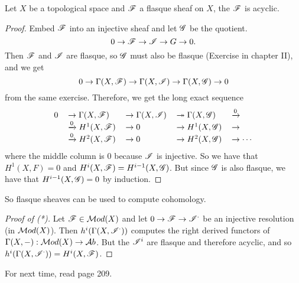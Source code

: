 \begin{proposition}
Let $X$ be a topological space and $\mathscr{F}$ a flasque sheaf on $X$,
the $\mathscr{F}$ is acyclic.
\end{proposition}
\begin{proof}
 Embed $\mathscr{F}$ into an injective sheaf and let $\mathscr{G}$ be the quotient.
 \[
    0\to \mathscr{F}\to \mathscr{I} \to G\to 0.
 \]
Then $\mathscr{F}$ and $\mathscr{I}$ are flasque, so $\mathscr{G}$ must also be flasque
(Exercise in chapter II), and we get
\[
    0\to \Gamma(X,\mathscr{F})\to \Gamma(X,\mathscr{I})\to \Gamma(X,\mathscr{G})\to 0
\]
from the same exercise.  Therefore, we get the long exact sequence
\[\begin{tabular}{lllll}
 0 &$\to \Gamma(X,\F) $&$\to \Gamma(X,\I) $&$\twoheadrightarrow
 \Gamma(X,\G) $&$\xrightarrow{0}$\\
 &$\xrightarrow{0} H^1(X,\F) $&$\to 0 $&$\to H^1(X,\G)$&$ \to$ \\
 &$\xrightarrow{0} H^2(X,\F) $&$\to 0 $&$\to H^2(X,\G)$&$ \to \cdots$ \\
\end{tabular}\]
where the middle column is 0 because $\mathscr{I}$ is injective.  So we
have that $H^1(X,F)=0$ and $H^i(X,\mathscr{F})=H^{i-1}(X,\mathscr{G})$.  But since
$\mathscr{G}$ is also flasque, we have that $H^{i-1}(X,\mathscr{G})=0$ by induction.
\end{proof}

So flasque sheaves can be used to compute cohomology.

\begin{proof}[Proof of (*)]
Let $\mathscr{F}\in \mathcal{M}od(X)$ and let $0\to \mathscr{F}\to \mathscr{I}^{\cdot}$ be an
injective resolution (in $\mathcal{M}od(X)$).  Then
$h^i(\Gamma(X,\mathscr{I}^{\cdot}))$ computes the right derived functors of
$\Gamma(X,-):\mathcal{M}od(X)\to \mathcal{A}b$.  But the $\mathscr{I}^i$ are flasque and
therefore acyclic, and so $h^i(\Gamma(X,\mathscr{I}^{\cdot})) = H^i(X,\mathscr{F})$.
\end{proof}

For next time, read page 209.
